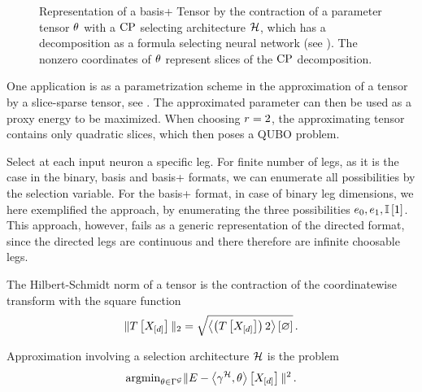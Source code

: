 \begin{figure}[h]
    \begin{center}
        
    \end{center}
    \caption{Representation of a basis+ Tensor by the contraction of a parameter tensor $\theta$ with a $\mathrm{CP}$ selecting architecture $\mathcal{H}$, which has a decomposition as a formula selecting neural network (see ).
    The nonzero coordinates of $\theta$ represent slices of the $\mathrm{CP}$ decomposition.
    }
\end{figure}\label{fig:sliceSelectingNN}



One application is as a parametrization scheme in the approximation of a tensor by a slice-sparse tensor, see .
The approximated parameter can then be used as a proxy energy to be maximized.
When choosing $r=2$, the approximating tensor contains only quadratic slices, which then poses a QUBO problem.

\begin{remark}
    Select at each input neuron a specific leg.
    For finite number of legs, as it is the case in the binary, basis and basis+ formats, we can enumerate all possibilities by the selection variable.
    For the basis+ format, in case of binary leg dimensions, we here exemplified the approach, by enumerating the three possibilities $e_{0},e_{1},\mathbb{I}\left[1\right]$.
    This approach, however, fails as a generic representation of the directed format, since the directed legs are continuous and there therefore are infinite choosable legs.
\end{remark}






The Hilbert-Schmidt norm of a tensor is the contraction of the coordinatewise transform with the square function
\begin{align*}
	\|T\left[X_{[d]}\right]\|_2= \sqrt{\left\langle \left(T\left[X_{[d]}\right]\right)2\right\rangle \left[ \varnothing \right]} \, .
\end{align*}

Approximation involving a selection architecture $\mathcal{H}$ is the problem
	\[ \mathrm{argmin}_{\theta\in\Gamma^{\mathcal{G}}} \|E - \left\langle \gamma^{\mathcal{H}},\theta\right\rangle \left[ X_{[d]} \right]\|^2 \, . \]

